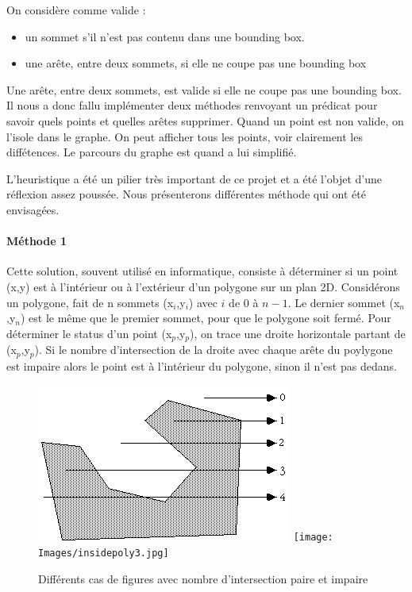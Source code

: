 \documentclass[a4paper,12pt]{report}
\begin{document}
On considère comme valide :
\begin{itemize}
 \item un sommet s'il n'est pas contenu dans une bounding box. 
 \item une arête, entre deux sommets, si elle ne coupe pas une bounding box
\end{itemize}

Une arête, entre deux sommets, est valide si elle ne coupe pas une bounding box. Il nous a donc fallu implémenter deux méthodes renvoyant un prédicat pour savoir quels points et quelles arêtes supprimer. 
Quand un point est non valide, on l'isole dans le graphe. On peut afficher tous les points, voir clairement les diffétences. Le parcours du graphe est quand a lui simplifié.

L'heuristique a été un pilier très important de ce projet et a été l'objet d'une réflexion assez poussée. Nous présenterons différentes méthode qui ont été envisagées.

\paragraph{Méthode 1 }
Cette solution, souvent utilisé en informatique, consiste à déterminer si un point (x,y) est à l'intérieur ou à l'extérieur d'un
polygone sur un plan 2D. 
Considérons un polygone, fait de n sommets (x$_{i}$,y$_{i}$) avec $i$ de $0$ à $n-1$. Le dernier sommet (x$_{n}$,y$_{n}$) est le même que le premier sommet, pour que le polygone soit fermé. 
Pour déterminer le status d'un point (x$_{p}$,y$_{p}$), on trace une droite horizontale partant de (x$_{p}$,y$_{p}$). 
Si le nombre d'intersection de la droite avec chaque arête du poylygone est impaire alors le point est à l'intérieur du polygone, sinon il n'est pas dedans.

\begin{figure}[h]
\includegraphics[scale=0.6]{Images/insidepoly1.jpg}
\texttt{[image: Images/insidepoly3.jpg]}
\caption{Différents cas de figures avec nombre d'intersection paire et impaire}
\label{nbintersect}
\end{figure}
\vspace{0.5cm}
\end{document}
